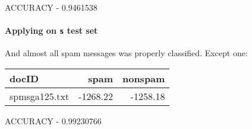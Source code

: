 \documentclass{article}
\begin{document}
\begin{multicols}{2}
\begin{center}
ACCURACY - 0.9461538
\end{center}

\paragraph*{Applying on \texttt{s} test set}
And almost all spam messages was properly classified.
Except one:\\

\begin{center}
\begin{tabular}{lrr}
  docID & spam & nonspam \\
  \hline
  spmsga125.txt & -1268.22 & -1258.18 \\
  \hline
\end{tabular}

ACCURACY - 0.99230766
\end{center}

\end{multicols}

\vfill


\end{document}

